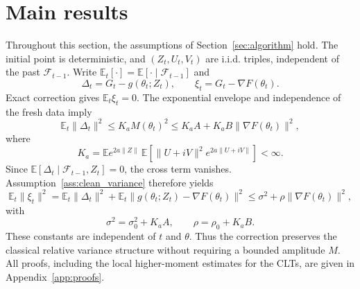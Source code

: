 \section{Main results}
\label{sec:main_results}

Throughout this section, the assumptions of Section~\ref{sec:algorithm}
hold. The initial point is deterministic, and $(Z_t,U_t,V_t)$ are i.i.d.
triples, independent of the past $\mathcal F_{t-1}$. Write
$\mathbb E_t[\cdot]=\mathbb E[\cdot\mid\mathcal F_{t-1}]$ and
\[
\Delta_t=G_t-g(\theta_t;Z_t),\qquad
\xi_t=G_t-\nabla F(\theta_t).
\]
Exact correction gives $\mathbb E_t\xi_t=0$. The exponential envelope and
independence of the fresh data imply
\[
\mathbb E_t\|\Delta_t\|^2\le K_aM(\theta_t)^2
\le K_aA+K_aB\|\nabla F(\theta_t)\|^2,
\]
where
\[
K_a=\mathbb E e^{2a\|Z\|}\,
\mathbb E\!\left[\|U+iV\|^2e^{2a\|U+iV\|}\right]<\infty.
\]
Since $\mathbb E[\Delta_t\mid\mathcal F_{t-1},Z_t]=0$, the cross term vanishes.
Assumption~\ref{ass:clean_variance} therefore yields
\begin{equation}\label{eq:relative_variance}
\mathbb E_t\|\xi_t\|^2
=\mathbb E_t\|\Delta_t\|^2+
\mathbb E_t\|g(\theta_t;Z_t)-\nabla F(\theta_t)\|^2
\le\sigma^2+\rho\|\nabla F(\theta_t)\|^2,
\end{equation}
with
\[
\sigma^2=\sigma_0^2+K_aA,\qquad \rho=\rho_0+K_aB.
\]
These constants are independent of $t$ and $\theta$. Thus the correction
preserves the classical relative variance structure without requiring
a bounded amplitude $M$. All proofs, including the local higher-moment
estimates for the CLTs, are given in Appendix~\ref{app:proofs}.

